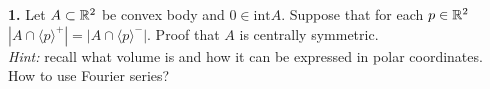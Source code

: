 \documentclass[12pt]{amsart}
\begin{document}
\textbf{1.} Let $A\subset\mathbb {R}^2$ be convex body and $0\in\mathrm{int} A$. Suppose that for each $p\in\mathbb {R}^2$ $|A\cap\langle p\rangle^+|=|A\cap\langle p\rangle^-|$. Proof that $A$ is centrally symmetric.\\
\textit{Hint:} recall what volume is and how it can be expressed in polar coordinates. How to use Fourier series?
\end{document}
